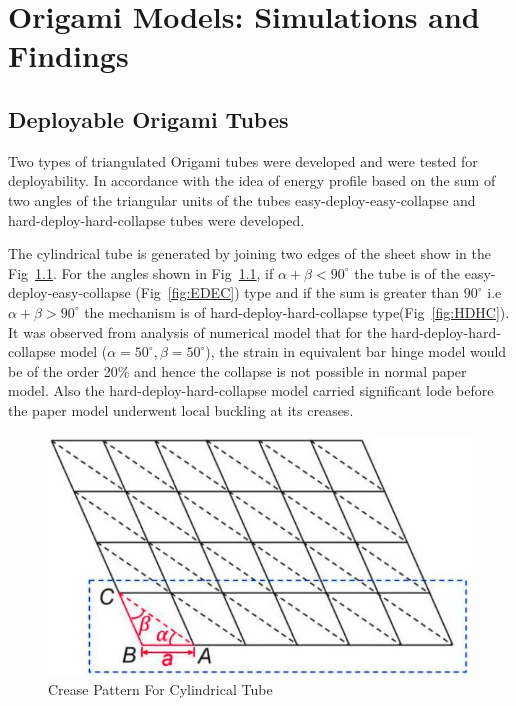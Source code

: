 \chapter{ Origami Models: Simulations and Findings}


\section{Deployable Origami Tubes}
Two types of triangulated Origami tubes were developed and were tested for deployability. In accordance with the idea of energy profile based on the sum of two angles of the triangular units of the tubes easy-deploy-easy-collapse and hard-deploy-hard-collapse tubes were developed\cite{Zha}. 

The cylindrical tube is generated by joining two edges of the sheet show in the Fig~\ref{fig:AlphaBeta}. For the angles shown in Fig~\ref{fig:AlphaBeta}, if $\alpha + \beta < 90^{\circ}$ the tube is of the easy-deploy-easy-collapse (Fig~\ref{fig:EDEC}) type and if the sum is greater than $90^{\circ}$ i.e $\alpha + \beta > 90^{\circ}$ the mechanism is of hard-deploy-hard-collapse type(Fig~\ref{fig:HDHC}). It was observed from analysis of numerical model that for the hard-deploy-hard-collapse model ($\alpha = 50^{\circ}, \beta = 50^{\circ}$), the strain in equivalent bar hinge model would be of the order 20\% and hence the collapse is not possible in normal paper model. Also the hard-deploy-hard-collapse model carried significant lode before the paper model underwent local buckling at its creases.
\begin{figure}[htbp]
\centering
\includegraphics[width=0.6\linewidth]{Figures/AlphaBeta.jpg}
\caption{Crease Pattern For Cylindrical Tube}
\label{fig:AlphaBeta}
\end{figure}

